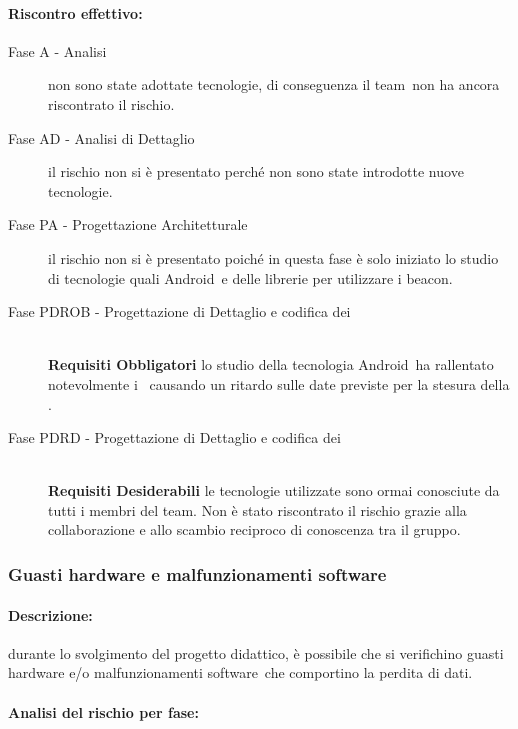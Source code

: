 \documentclass[../PianoProgetto.tex]{subfiles}
\begin{document}
	
	\paragraph*{Riscontro effettivo:} 
		\begin{description}
			\item[Fase A - Analisi] non sono state adottate tecnologie, di conseguenza il team\g\ non ha ancora riscontrato il rischio.
			\item[Fase AD - Analisi di Dettaglio] il rischio non si è presentato perché non sono state introdotte nuove tecnologie.
			\item[Fase PA - Progettazione Architetturale] il rischio non si è presentato poiché in questa fase è solo iniziato lo studio di tecnologie quali Android\g\ e delle librerie per utilizzare i beacon\g.
			\item[Fase PDROB - Progettazione di Dettaglio e codifica dei]  \ \\
					 \textbf{Requisiti Obbligatori} lo studio della tecnologia Android\g\ ha rallentato notevolmente i \progettisti\, causando un ritardo sulle date previste per la stesura della .
			\item[Fase PDRD - Progettazione di Dettaglio e codifica dei] \ \\
					\textbf{Requisiti Desiderabili} le tecnologie utilizzate sono ormai conosciute da tutti i membri del team\g. Non è stato riscontrato il rischio grazie alla collaborazione e allo scambio reciproco di conoscenza tra il gruppo.
		\end{description}

\newpage
	\subsubsection{Guasti hardware e malfunzionamenti software}
	\label{sec:Guasti hardware e malfunzionamenti software}
	
	\paragraph*{Descrizione:} durante lo svolgimento del progetto didattico, è possibile che si verifichino guasti hardware e/o malfunzionamenti software\g\ che comportino la perdita di dati.
	
	\paragraph*{Analisi del rischio per fase:} 
\end{document}
